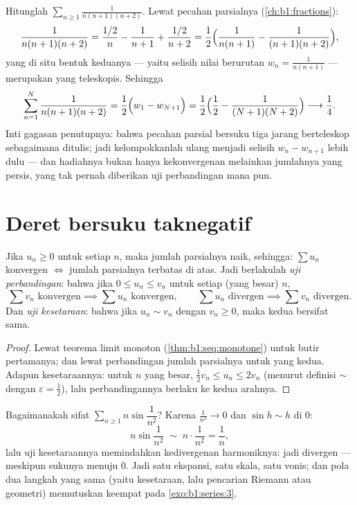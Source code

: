 \begin{example}\label{ex:b1:series:telescope3}
Hitunglah $\sum_{n\geq1} \frac{1}{n(n+1)(n+2)}$. Lewat pecahan
parsialnya (\cref{ch:b1:fractions}):
\[
\frac{1}{n(n+1)(n+2)}
= \frac{1/2}{n} - \frac{1}{n+1} + \frac{1/2}{n+2}
= \frac12\Bigl(\frac{1}{n(n+1)} - \frac{1}{(n+1)(n+2)}\Bigr),
\]
yang di situ bentuk keduanya --- yaitu selisih nilai berurutan
$w_n = \frac{1}{n(n+1)}$ --- merupakan yang teleskopis. Sehingga
\[
\sum_{n=1}^{N} \frac{1}{n(n+1)(n+2)}
= \frac12\Bigl(w_1 - w_{N+1}\Bigr)
= \frac12\Bigl(\frac12 - \frac{1}{(N+1)(N+2)}\Bigr)
\longrightarrow \frac14 .
\]
Inti gagasan penutupnya: bahwa pecahan parsial bersuku tiga jarang
berteleskop sebagaimana ditulis; jadi kelompokkanlah ulang menjadi selisih $w_n -
w_{n+1}$ lebih dulu --- dan hadiahnya bukan hanya kekonvergenan melainkan
jumlahnya yang persis, yang tak pernah diberikan uji perbandingan mana pun.
\end{example}

\section{Deret bersuku taknegatif}

\begin{theorem}\label{thm:b1:series:positive}
Jika $u_n \geq 0$ untuk setiap $n$, maka jumlah parsialnya naik, sehingga: $\sum
u_n$ konvergen $\iff$ jumlah parsialnya terbatas di atas. Jadi berlakulah
\emph{uji perbandingan}: bahwa jika $0 \leq u_n \leq v_n$ untuk setiap (yang besar)
$n$,
\[
\sum v_n \text{ konvergen} \implies \sum u_n \text{ konvergen},
\qquad
\sum u_n \text{ divergen} \implies \sum v_n \text{ divergen}.
\]
Dan \emph{uji kesetaraan}: bahwa jika $u_n \sim v_n$ dengan $v_n \geq
0$, maka kedua  bersifat sama.
\end{theorem}

\begin{proof}
Lewat teorema limit monoton (\cref{thm:b1:seq:monotone}) untuk butir
pertamanya; dan lewat perbandingan jumlah parsialnya untuk yang kedua. Adapun kesetaraannya: untuk
$n$ yang besar, $\frac12 v_n \leq u_n \leq 2 v_n$ (menurut definisi $\sim$
dengan $\varepsilon = \frac12$), lalu perbandingannya berlaku ke kedua arahnya.
\end{proof}

\begin{example}\label{ex:b1:series:equivdiverge}
Bagaimanakah sifat $\sum_{n\geq1} n\sin\dfrac{1}{n^2}$? Karena
$\frac{1}{n^2} \to 0$ dan $\sin h \sim h$ di $0$:
\[
n\sin\frac{1}{n^2} \;\sim\; n\cdot\frac{1}{n^2} = \frac1n ,
\]
lalu uji kesetaraannya memindahkan kedivergenan 
harmoniknya: jadi divergen --- meskipun sukunya menuju
$0$. Jadi satu ekspansi, satu skala, satu vonis; dan pola dua langkah
yang sama (yaitu kesetaraan, lalu pencarian Riemann atau geometri) memutuskan
keempat  pada \cref{exo:b1:series:3}.
\end{example}

